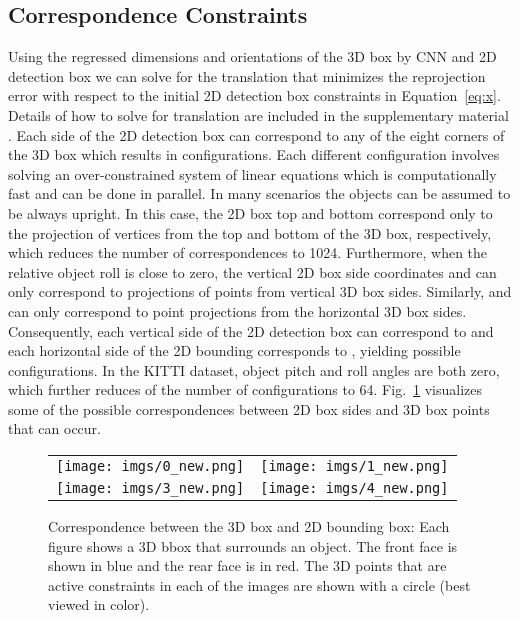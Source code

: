 \documentclass[10pt,twocolumn,letterpaper]{article}
\begin{document}
\subsection{Correspondence Constraints}
Using the regressed dimensions and orientations of the 3D box by CNN and 2D detection box we can solve for the translation  that minimizes the reprojection error with respect to the initial 2D detection box constraints in Equation~\ref{eq:x}. Details of how to solve for translation are included in the supplementary material \cite{Supplementary}. Each side of the 2D detection box can correspond to any of the eight corners of the 3D box which results in  configurations. Each different configuration involves solving an over-constrained system of linear equations which is computationally fast and can be done in parallel. In many scenarios the objects can be assumed to be always upright. In this case, the 2D box top and bottom correspond only to the projection of vertices from the top and bottom of the 3D box, respectively, which reduces the number of correspondences to 1024. Furthermore, when the  relative object roll is close to zero, the vertical 2D box side coordinates  and  can only correspond to projections of points from vertical 3D box sides.
Similarly,  and  can only correspond to point projections from the horizontal 3D box sides.
Consequently, each vertical side of the 2D detection box can correspond to  and each horizontal side of the 2D bounding corresponds to , yielding  possible configurations. In the KITTI dataset, object pitch and roll angles are both zero, which further reduces of the number of configurations to 64.  Fig.~\ref{fig:cubes} visualizes some of the possible correspondences between 2D box sides and 3D box points that can occur.

\begin{figure}[t]
\centering
\begin{tabular}{cc}
\texttt{[image: imgs/0\_new.png]} & \texttt{[image: imgs/1\_new.png]} \\
\texttt{[image: imgs/3\_new.png]} & \texttt{[image: imgs/4\_new.png]}
\end{tabular}
\caption{Correspondence between the 3D box and 2D bounding box: Each figure shows a 3D bbox that surrounds an object. The front face is shown in blue and the rear face is in red. The 3D points that are active constraints in each of the images are shown with a circle (best viewed in color). }
\label{fig:cubes}
\end{figure}
\end{document}
